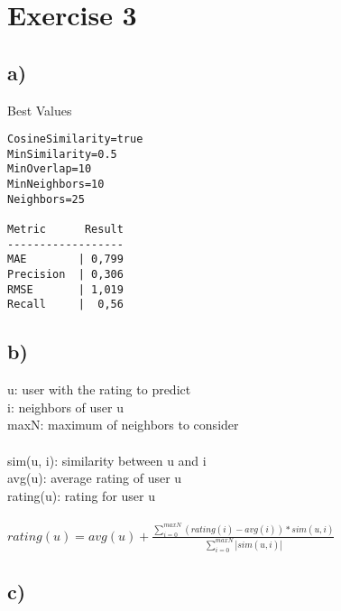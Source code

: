 \documentclass{article}
\begin{document}
\vspace{2cm}
\section*{Exercise 3}
\subsection*{a)}
Best Values
\begin{lstlisting}
CosineSimilarity=true
MinSimilarity=0.5
MinOverlap=10
MinNeighbors=10
Neighbors=25

Metric      Result
------------------
MAE        | 0,799 
Precision  | 0,306 
RMSE       | 1,019 
Recall     |  0,56 
\end{lstlisting}

\subsection*{b)}
u: user with the rating to predict\\
i: neighbors of user u\\
maxN: maximum of neighbors to consider \\
\\
sim(u, i): similarity between u and i\\
avg(u): average rating of user u\\
rating(u): rating for user u\\
\\
$
rating(u) = avg(u) + \frac{\sum\limits_{i=0}^{maxN} (rating(i) - avg(i)) *
sim(u, i)} {\sum\limits_{i=0}^{maxN} |sim(u, i) | }
$

\subsection*{c)}
\end{document}
